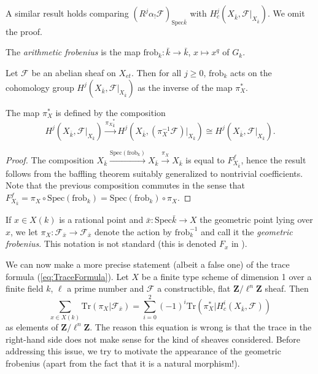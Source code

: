 A similar result holds comparing $(R^j\alpha_!\mathcal{F})_{\text{Spec} \bar k}$ with $H^j_c (X_{\bar k}, \mathcal{F}|_{X_{\bar k}})$. We omit the proof.

\begin{definition}
The \emph{arithmetic frobenius} is the map $\text{frob}_k : \bar k \to \bar k$, $x \mapsto x^q$  of $G_k$.
\end{definition}

\begin{theorem}
Let $\mathcal{F}$ be an abelian sheaf on $X_{et}$. Then for all $j\geq 0$, $\text{frob}_k$ acts on the cohomology group $H^j(X_{\bar k}, \mathcal{F}|_{X_{\bar k}})$ as the inverse of the map $\pi_X^*$.
\end{theorem}

The map $\pi_X^*$ is defined by the composition
$$
H^j(X_{\bar k}, \mathcal{F}|_{X_{\bar k}}) \xrightarrow{{\pi_X}_{\bar k}^*}
H^j(X_{\bar k}, (\pi_X^{-1} \mathcal{F})|_{X_{\bar k}}) \cong
H^j(X_{\bar k}, \mathcal{F}|_{X_{\bar k}}).
$$

\begin{proof}
The composition $X_{\bar k} \xrightarrow{\text{Spec}(\text{frob}_k)} X_{\bar k} \xrightarrow{\pi_X} X_{\bar k}$ is equal to $F_{X_{\bar k}}^f$, hence the result follows from the baffling theorem suitably generalized to nontrivial coefficients. Note that the previous composition commutes in the sense that $F_{X_{\bar k}}^f = \pi_X \circ \text{Spec}(\text{frob}_k) = \text{Spec}(\text{frob}_k) \circ \pi_X$.
\end{proof}

\begin{definition}
If $x \in X(k)$ is a rational point and $\bar x : \text{Spec} \bar k \to X$ the geometric point lying over $x$, we let $\pi_X : \mathcal{F}_{\bar x} \to \mathcal{F}_{\bar x}$ denote the action by $\text{frob}_k^{-1}$ and call it the \emph{geometric frobenius}. This notation is not standard (this is denoted $F_x$ in \cite{SGA4.5}).
\end{definition}

We can now make a more precise statement (albeit a false one) of the trace formula (\ref{eq:TraceFormula}). Let $X$ be a finite type scheme of dimension 1 over a finite field $k$, $\ell$ a prime number and $\mathcal{F}$ a constructible, flat $\mathbf{Z}/\ell^n\mathbf{Z}$ sheaf. Then
$$
\sum_{x \in X(k)} \text{Tr}(\pi_X | \mathcal{F}_{\bar x}) = \sum_{i=0}^2 (-1)^i \text{Tr}(\pi_X^* | H^i_c(X_{\bar k}, \mathcal{F}))
$$
as elements of $\mathbf{Z}/\ell^n\mathbf{Z}$. The reason this equation is wrong is that the trace in the right-hand side does not make sense for the kind of sheaves considered. Before addressing this issue, we try to motivate the appearance of the geometric frobenius (apart from the fact that it is a natural morphism!). 

